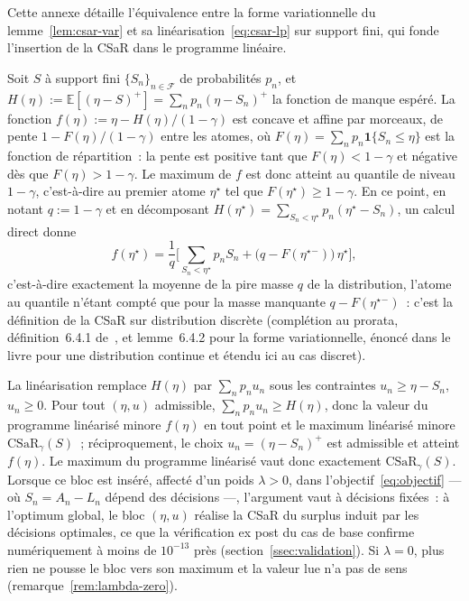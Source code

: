 \documentclass[11pt,letterpaper]{article}
\newcommand{\E}{\mathbb{E}}
\newcommand{\CSaR}{\mathrm{CSaR}}
\newcommand{\pos}[1]{\left(#1\right)^{+}}
\theoremstyle{definition}
\begin{document}
Cette annexe détaille l'équivalence entre la forme variationnelle du
lemme~\ref{lem:csar-var} et sa linéarisation~\eqref{eq:csar-lp} sur support
fini, qui fonde l'insertion de la CSaR dans le programme linéaire.

Soit $S$ à support fini $\{S_n\}_{n \in \mathcal F}$ de probabilités $p_n$, et
$H(\eta) := \E[\pos{\eta - S}] = \sum_n p_n \pos{\eta - S_n}$ la fonction de
manque espéré. La fonction
$f(\eta) := \eta - H(\eta)/(1-\gamma)$ est concave et affine par morceaux, de
pente $1 - F(\eta)/(1-\gamma)$ entre les atomes, où
$F(\eta) = \sum_n p_n \mathbf 1\{S_n \le \eta\}$ est la fonction de
répartition~: la pente est positive tant que $F(\eta) < 1-\gamma$ et négative
dès que $F(\eta) > 1-\gamma$. Le maximum de $f$ est donc atteint au quantile
de niveau $1-\gamma$, c'est-à-dire au premier atome $\eta^\star$ tel que
$F(\eta^\star) \ge 1-\gamma$. En ce point, en notant
$q := 1-\gamma$ et en décomposant $H(\eta^\star) =
\sum_{S_n < \eta^\star} p_n (\eta^\star - S_n)$, un calcul direct donne
\[
f(\eta^\star)
= \frac{1}{q}\Big[\sum_{S_n < \eta^\star} p_n S_n
+ \big(q - F(\eta^\star{}^-)\big)\,\eta^\star\Big],
\]
c'est-à-dire exactement la moyenne de la pire masse $q$ de la distribution,
l'atome au quantile n'étant compté que pour la masse manquante
$q - F(\eta^\star{}^-)$~: c'est la définition de la CSaR sur distribution
discrète (complétion au prorata, définition~6.4.1 de~\cite{KHvdVR2020}, et
lemme~6.4.2 pour la forme variationnelle, énoncé dans le livre pour une
distribution continue et étendu ici au cas discret).

La linéarisation remplace $H(\eta)$ par $\sum_n p_n u_n$ sous les contraintes
$u_n \ge \eta - S_n$, $u_n \ge 0$. Pour tout $(\eta, u)$ admissible,
$\sum_n p_n u_n \ge H(\eta)$, donc la valeur du programme linéarisé minore
$f(\eta)$ en tout point et le maximum linéarisé minore $\CSaR_\gamma(S)$~;
réciproquement, le choix $u_n = \pos{\eta - S_n}$ est admissible et atteint
$f(\eta)$. Le maximum du programme linéarisé vaut donc exactement
$\CSaR_\gamma(S)$. Lorsque ce bloc est inséré, affecté d'un poids
$\lambda > 0$, dans l'objectif~\eqref{eq:objectif} --- où $S_n = A_n - L_n$
dépend des décisions ---, l'argument vaut à décisions fixées~: à l'optimum
global, le bloc $(\eta, u)$ réalise la CSaR du surplus induit par les
décisions optimales, ce que la vérification ex post du cas de base confirme
numériquement à moins de $10^{-13}$ près
(section~\ref{ssec:validation}). Si $\lambda = 0$, plus rien ne pousse le
bloc vers son maximum et la valeur lue n'a pas de sens
(remarque~\ref{rem:lambda-zero}).
\end{document}
